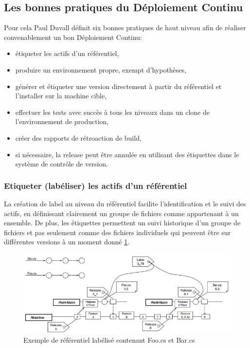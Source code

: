     \subsection{Les bonnes pratiques du Déploiement Continu}
    Pour cela Paul Duvall définit six bonnes pratiques de haut niveau afin de réaliser convenablement un bon Déploiement Continu:\\
    \begin{itemize}
      \item étiqueter les actifs d'un référentiel,
      \item produire un environnement propre, exempt d'hypothèses,
      \item générer et étiqueter une version directement à partir du référentiel et l'installer sur la machine cible,
      \item effectuer les tests avec succès à tous les niveaux dans un clone de l'environnement de production,
      \item créer des rapports de rétroaction de build,
      \item	si nécessaire, la release peut être annulée en utilisant des étiquettes dans le système de contrôle de version.\\
    \end{itemize}

      \subsubsection{Etiqueter (labéliser) les actifs d’un référentiel}
      La création de label au niveau du référentiel facilite l'identification et le suivi des actifs, en définissant clairement un groupe de fichiers comme appartenant à un ensemble. De plus, les étiquettes permettent un suivi historique d'un groupe de fichiers et pas seulement comme des fichiers individuels qui peuvent être sur différentes versions à un moment donné \ref{Labels Referential}.

      \begin{figure}
        \begin{center}
          \includegraphics[scale=0.7]{images/Labels.png}
        \end{center}
        \caption{Exemple de référentiel labélisé contenant Foo.cs et Bar.cs}
        \label{Labels Referential}
      \end{figure}

